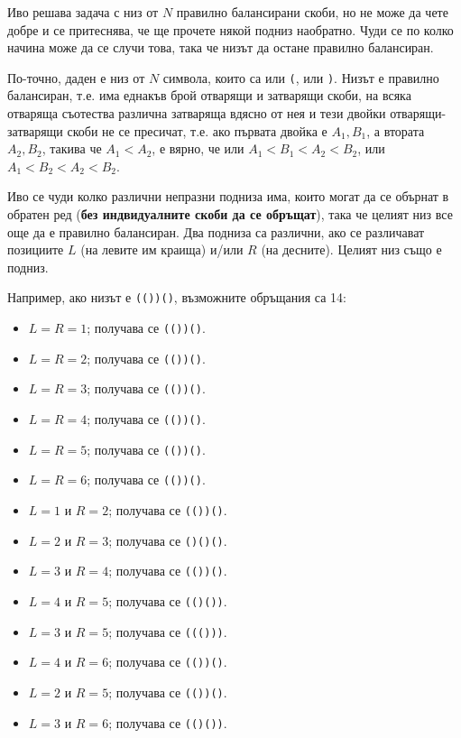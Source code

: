 \documentclass[12pt]{article}
\begin{document}
	

Иво решава задача с низ от $N$ правилно балансирани скоби, но не може да чете добре и се притеснява, че ще прочете някой подниз наобратно. Чуди се по колко начина може да се случи това, така че низът да остане правилно балансиран.

По-точно, даден е низ от $N$ символа, които са или \verb|(|, или \verb|)|. Низът е правилно балансиран, т.е. има еднакъв брой отварящи и затварящи скоби, на всяка отваряща съотества различна затваряща вдясно от нея и тези двойки отварящи-затварящи скоби не се пресичат, т.е. ако първата двойка е $A_1, B_1$, а втората $A_2, B_2$, такива че $A_1 < A_2$, е вярно, че или $A_1 < B_1 < A_2 < B_2$, или $A_1 < B_2 < A_2 < B_2$. 

Иво се чуди колко различни непразни подниза има, които могат да се обърнат в обратен ред (\textbf{без индвидуалните скоби да се обръщат}), така че целият низ все още да е правилно балансиран. Два подниза са различни, ако се различават позициите $L$ (на левите им краища) и/или $R$ (на десните). Целият низ също е подниз.

Например, ако низът е \verb|(())()|, възможните обръщания са 14:

\begin{itemize}
\item $L = R = 1$; получава се \verb|(())()|.
\item $L = R = 2$; получава се \verb|(())()|.
\item $L = R = 3$; получава се \verb|(())()|.
\item $L = R = 4$; получава се \verb|(())()|.
\item $L = R = 5$; получава се \verb|(())()|.
\item $L = R = 6$; получава се \verb|(())()|.
\item $L = 1$ и $R = 2$; получава се \verb|(())()|.
\item $L = 2$ и $R = 3$; получава се \verb|()()()|.
\item $L = 3$ и $R = 4$; получава се \verb|(())()|.
\item $L = 4$ и $R = 5$; получава се \verb|(()())|.
\item $L = 3$ и $R = 5$; получава се \verb|((()))|.
\item $L = 4$ и $R = 6$; получава се \verb|(())()|.
\item $L = 2$ и $R = 5$; получава се \verb|(())()|.
\item $L = 3$ и $R = 6$; получава се \verb|(()())|.
\end{itemize}
\end{document}
